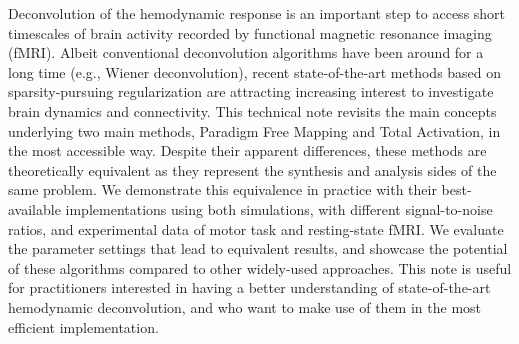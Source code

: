 Deconvolution of the hemodynamic response is an important step to access short timescales of brain activity recorded by functional magnetic resonance imaging (fMRI). Albeit conventional deconvolution algorithms have been around for a long time (e.g., Wiener deconvolution), recent state-of-the-art methods based on sparsity-pursuing regularization are attracting increasing interest to investigate brain dynamics and connectivity. This technical note revisits the main concepts underlying two main methods, Paradigm Free Mapping and Total Activation, in the most accessible way. Despite their apparent differences, these methods are theoretically equivalent as they represent the synthesis and analysis sides of the same problem. We demonstrate this equivalence in practice with their best-available implementations using both simulations, with different signal-to-noise ratios, and experimental data of motor task and resting-state fMRI. We evaluate the parameter settings that lead to equivalent results, and showcase the potential of these algorithms compared to other widely-used approaches. This note is useful for practitioners interested in having a better understanding of state-of-the-art hemodynamic deconvolution, and who want to make use of them in the most efficient implementation.